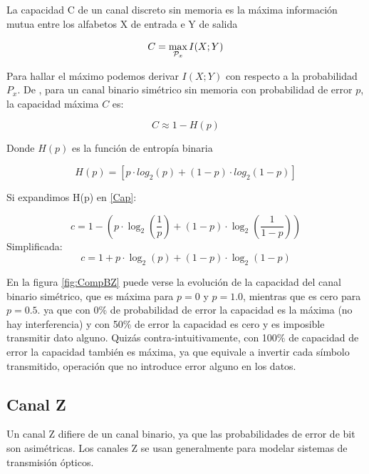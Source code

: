 La capacidad C de un canal discreto sin memoria es la máxima información mutua entre los alfabetos X de entrada e Y de salida

\begin{equation}
C = \max_{{\cal{P}}_x} I(X;Y) 
\end{equation}

Para hallar el máximo podemos derivar $I(X;Y)$ con respecto a la probabilidad $P_x$.
De \cite{MacKay:2002}, para un canal binario simétrico sin memoria con probabilidad de error $p$, la capacidad máxima $C$ es:

\begin{equation}\label{Cap}
C \approx 1 - H(p) 
\end{equation}

Donde $H(p)$ es la función de entropía binaria

\begin{equation}\label{Hp}
 H(p) = [p \cdot log_2(p) + (1-p)\cdot log_2 (1-p)]
\end{equation}

Si expandimos H(p) en \ref{Cap}:

$$ c = 1-\left(p \cdot \log_2\left(\frac{1}{p}\right) + (1-p) \cdot \log_2\left(\frac{1}{1-p}\right)\right) $$
Simplificada:
$$ c = 1 + p \cdot \log_2(p) + (1 - p) \cdot \log_2(1-p) $$

En la figura \ref{fig:CompBZ} puede verse la evolución de la capacidad del canal binario simétrico, que es máxima para $p=0$ y $p=1.0$, mientras que es cero para $p=0.5$. ya que con 0\% de probabilidad de error la capacidad es la máxima (no hay interferencia) y con 50\% de error la capacidad es cero y es imposible transmitir dato alguno. Quizás contra-intuitivamente, con 100\% de capacidad de error la capacidad también es máxima, ya que equivale a invertir cada símbolo transmitido, operación que no introduce error alguno en los datos.


\subsection{Canal Z}
\label{canalZ}
Un canal Z difiere de un canal binario, ya que las probabilidades de error de bit son asimétricas.
Los canales Z se usan generalmente para modelar sistemas de transmisión ópticos.


